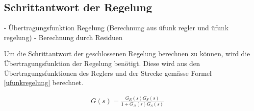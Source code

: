 \newpage
\subsection{Schrittantwort der Regelung}
- Übertragungsfunktion Regelung (Berechnung aus üfunk regler und üfunk regelung)\newline
- Berechnung durch Residuen\newline

Um die Schrittantwort der geschlossenen Regelung berechnen zu können, wird die Übertragungsfunktion der Regelung benötigt. Diese wird aus den Übertragungsfunktionen des Reglers und der Strecke gemässe Formel \ref{ufunkregelung} berechnet.

\begin{align}
G(s)=\frac{G_R(s)G_S(s)}{1+G_R(s)G_S(s)}
\label{ufunkregelung}
\end{align}
